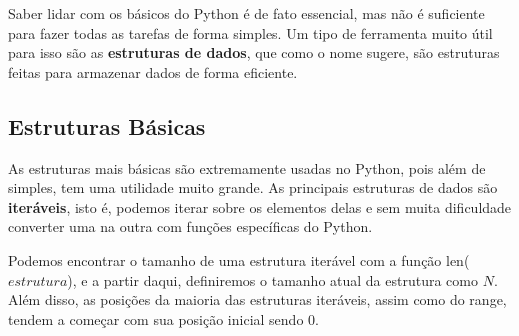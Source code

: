 \documentclass[11pt, a4paper]{article}
\begin{document}
Saber lidar com os básicos do Python é de fato essencial, mas não é suficiente para fazer todas as tarefas de forma simples. Um tipo de ferramenta muito útil para isso são as \textbf{estruturas de dados}, que como o nome sugere, são estruturas feitas para armazenar dados de forma eficiente.

\subsection{Estruturas Básicas}

As estruturas mais básicas são extremamente usadas no Python, pois além de simples, tem uma utilidade muito grande. As principais estruturas de dados são \textbf{iteráveis}, isto é, podemos iterar sobre os elementos delas e sem muita dificuldade converter uma na outra com funções específicas do Python. 

Podemos encontrar o tamanho de uma estrutura iterável com a função len(\(estrutura\)), e a partir daqui, definiremos o tamanho atual da estrutura como \(N\). Além disso, as posições da maioria das estruturas iteráveis, assim como do range, tendem a começar com sua posição inicial sendo 0.
\end{document}
